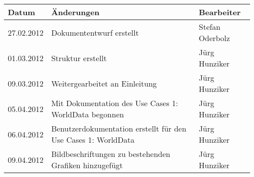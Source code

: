 \begin{tabular}{|l|l|l|}
\hline 
Datum & Änderungen & Bearbeiter \\ 
\hline 
27.02.2012 & Dokumententwurf erstellt & Stefan Oderbolz \\ 
\hline 
01.03.2012 & Struktur erstellt & Jürg Hunziker \\ 
\hline 
09.03.2012 & Weitergearbeitet an Einleitung & Jürg Hunziker \\ 
\hline 
05.04.2012 & Mit Dokumentation des Use Cases 1: WorldData begonnen & Jürg Hunziker \\ 
\hline 
06.04.2012 & Benutzerdokumentation erstellt für den Use Cases 1: WorldData & Jürg Hunziker \\ 
\hline 
09.04.2012 & Bildbeschriftungen zu bestehenden Grafiken hinzugefügt & Jürg Hunziker \\ 
\hline 
\end{tabular} 
